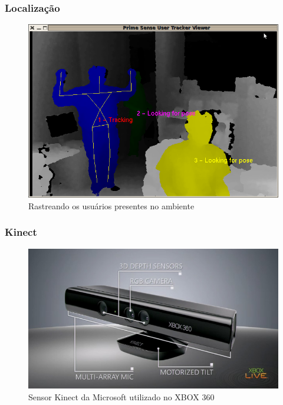 \documentclass{beamer}
\begin{document}
\begin{frame}
    \frametitle{Localização}
    \begin{figure}[h]
    \centering \includegraphics[scale=0.3]{figuras/sampleOpenNI.png}
        \caption{Rastreando os usuários presentes no ambiente}
        \label{sampleOpenNI}
    \end{figure}   
\end{frame}


\begin{frame}
    \frametitle{Kinect}
    
    \begin{figure}[h]
    \centering \includegraphics[scale=0.4]{figuras/kinect_info.jpg}
        \caption{Sensor Kinect da Microsoft utilizado no XBOX 360}
        \label{reconhecimento_facial}
    \end{figure}
\end{frame}

\end{document}
